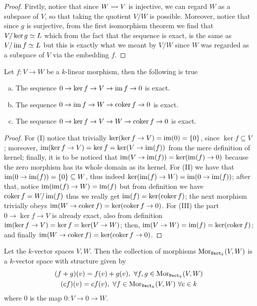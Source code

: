 \begin{proof}
Firstly, notice that since \(W \rightarrowtail V\) is injective, we can
regard \(W\) as a subspace of \(V\), so that taking the quotient \(V/W\) is
possible. Moreover, notice that since \(g\) is surjective, from the first
isomorphism theorem we find that \(V/\ker g \simeq L\) which from the fact that
the sequence is exact, is the same as \(V/\operatorname{im} f \simeq L\) but this is exactly
what we meant by \(V/W\) since \(W\) was regarded as a subspace of \(V\) via
the embedding \(f\).
\end{proof}

\begin{proposition}
  Let \(f : V \to W\) be a \(k\)-linear morphism, then the following is true
  \begin{enumerate}[(a).]
    \item The sequence \(0 \to \ker f \to V \to \operatorname{im} f \to 0\) is exact.
    \item The sequence \(0 \to \operatorname{im} f \to W \to \operatorname{coker} f \to 0\) is exact.
    \item The sequence \(0 \to \ker f \to V \to W \to \operatorname{coker} f \to 0\) is
      exact.
  \end{enumerate}
\end{proposition}

\begin{proof}
For (I) notice that trivially \(\ker(\ker f \to V) = \operatorname{im}(0) = \{0\}\), since
\(\ker f \subseteq V\); moreover, \(\operatorname{im}(\ker f \to V) = \ker f = \ker(V \to
\operatorname{im}(f))\) from the mere definition of kernel; finally, it is to be noticed
that \(\operatorname{im}(V \to \operatorname{im}(f)) = \ker(\operatorname{im}(f) \to 0)\) because the zero morphism has
its whole domain as its kernel.
For (II) we have that \(\operatorname{im}(0 \to \operatorname{im}(f)) = \{0\} \subseteq W\), thus indeed
\(\ker(\operatorname{im}(f) \to W) = \operatorname{im}(0 \to \operatorname{im}(f))\); after that, notice \(\operatorname{im}(\operatorname{im}(f)
\to W) = \operatorname{im}(f)\) but from definition we have \(\operatorname{coker} f = W/\operatorname{im}(f)\) thus we
really get \(\operatorname{im}(f) = \ker(\operatorname{coker} f)\); the next morphism trivially obeys
\(\operatorname{im}(W \to \operatorname{coker} f) = \ker(\operatorname{coker} f \to 0)\).
For (III) the part \(0 \to \ker f \to V\) is already exact, also from
definition \(\operatorname{im}(\ker f \to V) = \ker f = \ker(V \to W)\); then, \(\operatorname{im}(V \to
W) = \operatorname{im}(f) = \ker(\operatorname{coker} f)\); and finally  \(\operatorname{im}(W \to \operatorname{coker} f) =
\ker(\operatorname{coker} f \to 0)\).
\end{proof}

\begin{definition}
Let the \(k\)-vector spaces \(V, W\). Then the collection of morphisms
\(\operatorname{Mor}_{{\texttt{Vect}}_k}(V, W)\) is a \(k\)-vector space with structure given by
\begin{gather*}
  (f + g)(v) = f(v) + g(v),\ \forall f, g \in \operatorname{Mor}_{{\texttt{Vect}}_k}(V, W) \\
  (cf)(v) = c f(v),\ \forall f \in \operatorname{Mor}_{{\texttt{Vect}}_k}(V, W)\ \forall c \in k
\end{gather*}
where \(0\) is the map \(0 : V \to 0 \to W\).
\end{definition}

